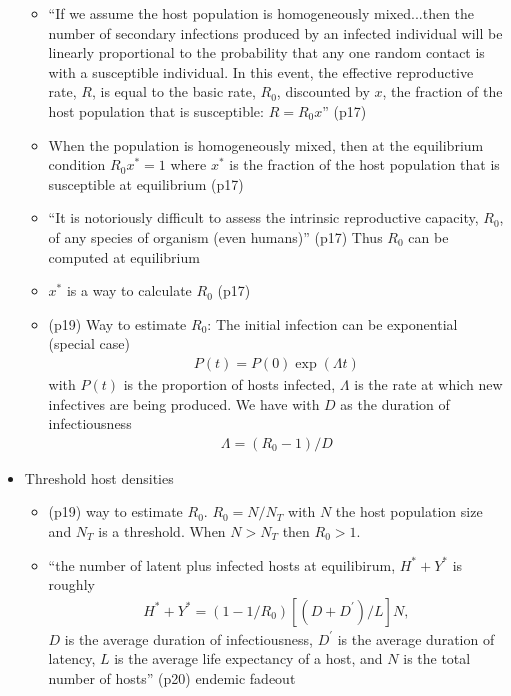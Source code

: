 \message{ !name(refs.tex)}\documentclass{article}
\newcommand\rz{$R_0$}
\begin{document}
\begin{itemize}
\begin{itemize}
  \item ``If we assume the host population is homogeneously mixed...then the number of secondary infections produced by an infected individual will be linearly proportional to the probability that any one random contact is with a susceptible individual.  In this event, the effective reproductive rate, $R$, is equal to the basic rate, $R_0$, discounted by $x$, the fraction of the host population that is susceptible: $R=R_0x$'' (p17)
  \item When the population is homogeneously mixed, then at the equilibrium condition $R_0x^* = 1$ where $x^*$ is the fraction of the host population that is susceptible at equilibrium (p17)
  \item ``It is notoriously difficult to assess the intrinsic reproductive capacity, $R_0$, of any species of organism (even humans)'' (p17)  Thus $R_0$ can be computed at equilibrium
  \item  $x^*$ is a way to calculate $R_0$ (p17)
  \item  (p19) Way to estimate $R_0$:  The initial infection can be exponential (special case)
    \begin{align*}
      P(t) = P(0) \exp ( \Lambda t)
    \end{align*}
with $P(t)$ is the proportion of hosts infected, $\Lambda$ is the rate at which new infectives are being produced.  We have with $D$ as the duration of infectiousness
\begin{align*}
  \Lambda = (R_0 - 1)/D
\end{align*}
  \end{itemize}
\item Threshold host densities
  \begin{itemize}
  \item (p19) way to estimate \rz.  \rz $= N/N_T$ with $N$ the host population size and $N_T$ is a threshold.  When $N > N_T $ then $R_0  > 1$.
  \item ``the number of latent plus infected hosts at equilibirum, $H^* + Y^*$ is roughly
\begin{align*}
H^* + Y^* = (1 - 1/R_0)[ (D + D^\prime)/L] N,
\end{align*}
$D$ is the average duration of infectiousness, $D^\prime$ is the average duration of latency, $L$ is the average life expectancy of a host, and $N$ is the total number of hosts'' (p20) endemic fadeout
  \end{itemize}
\end{itemize}
\end{document}
